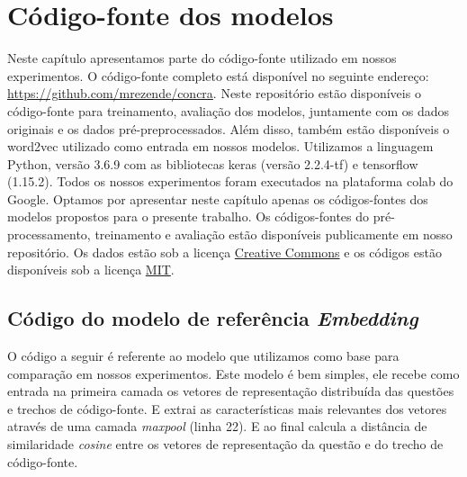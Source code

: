 \chapter{Código-fonte dos modelos}
\label{ape:codigo-fonte-dos-modelos}

Neste capítulo apresentamos parte do código-fonte utilizado em nossos experimentos. O código-fonte completo está disponível no seguinte endereço: \url{https://github.com/mrezende/concra}. Neste repositório estão disponíveis o código-fonte para treinamento, avaliação dos modelos, juntamente com os dados originais e os dados pré-preprocessados. Além disso, também estão disponíveis o word2vec utilizado como entrada em nossos modelos. Utilizamos a linguagem Python, versão 3.6.9 com as bibliotecas \Gls{keras} (versão 2.2.4-tf) e \Gls{tensorflow} (1.15.2). Todos os nossos experimentos foram executados na plataforma \Gls{colab} do Google. Optamos por apresentar neste capítulo apenas os códigos-fontes dos modelos propostos para o presente trabalho. Os códigos-fontes do pré-processamento, treinamento e avaliação estão disponíveis publicamente em nosso repositório. Os dados estão sob a licença \href{https://creativecommons.org/licenses/by/4.0/}{Creative Commons} e os códigos estão disponíveis sob a licença \href{https://opensource.org/licenses/MIT}{MIT}.

\section{Código do modelo de referência \textit{Embedding}}
\label{sec:codigo-modelo-embedding}

O código a seguir é referente ao modelo que utilizamos como base para comparação em nossos experimentos. Este modelo é bem simples, ele recebe como entrada na primeira camada os vetores de representação distribuída das questões e trechos de código-fonte. E extrai as características mais relevantes dos vetores através de uma camada \textit{maxpool} (linha 22). E ao final calcula a distância de similaridade \textit{cosine} entre os vetores de representação da questão e do trecho de código-fonte. 

